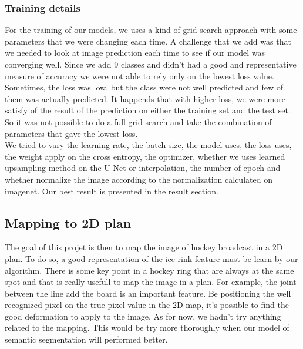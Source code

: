 \subsubsection{Training details}
For the training of our models, we uses a kind of grid search approach with some parameters that we were changing each time. A challenge that we add was that we needed to look at image prediction each time to see if our model was converging well. Since we add 9 classes and didn't had a good and representative measure of accuracy we were not able to rely only on the lowest loss value. Sometimes, the loss was low, but the class were not well predicted and few of them was actually predicted. It happends that with higher loss, we were more satisfy of the result of the prediction on either the training set and the test set. So it was not possible to do a full grid search and take the combination of parameters that gave the lowest loss. 
\\
We tried to vary the learning rate, the batch size, the model uses, the loss uses, the weight apply on the cross entropy, the optimizer, whether we uses learned upsampling method on the U-Net or interpolation, the number of epoch and whether normalize the image according to the normalization calculated on imagenet. Our best result is presented in the result section. 

\subsection{Mapping to 2D plan}
The goal of this projet is then to map the image of hockey broadcast in a 2D plan. To do so, a good representation of the ice rink feature must be learn by our algorithm. There is some key point in a hockey ring that are always at the same spot and that is really usefull to map the image in a plan. For example, the joint between the line add the board is an important feature. Be positioning the well recognized pixel on the true pixel value in the 2D map, it's possible to find the good deformation to apply to the image. As for now, we hadn't try anything related to the mapping. This would be try more thoroughly when our model of semantic segmentation will performed better. 



